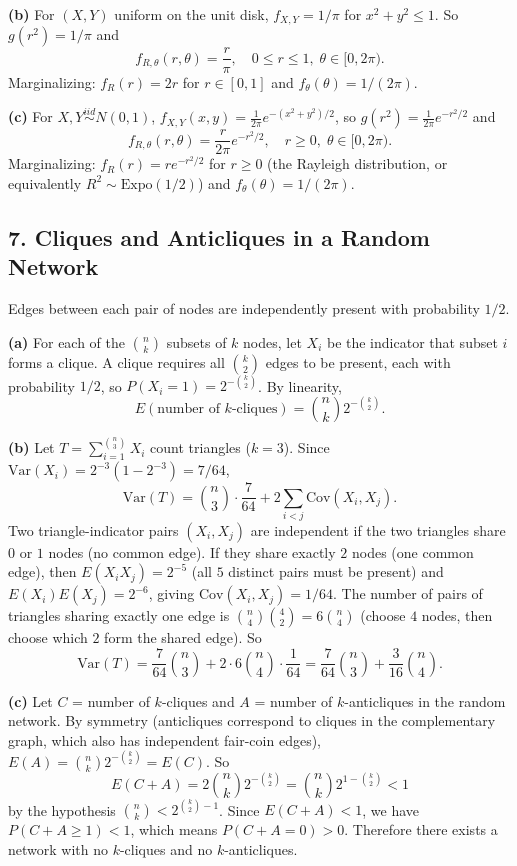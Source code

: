 \documentclass{article}
\begin{document}
\textbf{(b)} For $(X,Y)$ uniform on the unit disk, $f_{X,Y}=1/\pi$ for $x^2+y^2\le1$. So $g(r^2)=1/\pi$ and
$$
f_{R,\theta}(r,\theta) = \frac{r}{\pi}, \quad 0\le r\le1,\;\theta\in[0,2\pi).
$$
Marginalizing: $f_R(r)=2r$ for $r\in[0,1]$ and $f_\theta(\theta)=1/(2\pi)$.

\textbf{(c)} For $X,Y\overset{iid}{\sim}N(0,1)$, $f_{X,Y}(x,y)=\frac{1}{2\pi}e^{-(x^2+y^2)/2}$, so $g(r^2)=\frac{1}{2\pi}e^{-r^2/2}$ and
$$
f_{R,\theta}(r,\theta) = \frac{r}{2\pi}e^{-r^2/2}, \quad r\ge0,\;\theta\in[0,2\pi).
$$
Marginalizing: $f_R(r)=re^{-r^2/2}$ for $r\ge0$ (the Rayleigh distribution, or equivalently $R^2\sim\text{Expo}(1/2)$) and $f_\theta(\theta)=1/(2\pi)$.

\subsection*{7. Cliques and Anticliques in a Random Network}

Edges between each pair of nodes are independently present with probability $1/2$.

\textbf{(a)} For each of the $\binom{n}{k}$ subsets of $k$ nodes, let $X_i$ be the indicator that subset $i$ forms a clique. A clique requires all $\binom{k}{2}$ edges to be present, each with probability $1/2$, so $P(X_i=1)=2^{-\binom{k}{2}}$. By linearity,
$$
E\!\left(\text{number of }k\text{-cliques}\right) = \binom{n}{k}2^{-\binom{k}{2}}.
$$

\textbf{(b)} Let $T=\sum_{i=1}^{\binom{n}{3}}X_i$ count triangles ($k=3$). Since $\text{Var}(X_i)=2^{-3}(1-2^{-3})=7/64$,
$$
\text{Var}(T) = \binom{n}{3}\cdot\frac{7}{64} + 2\sum_{i<j}\text{Cov}(X_i,X_j).
$$
Two triangle-indicator pairs $(X_i,X_j)$ are independent if the two triangles share $0$ or $1$ nodes (no common edge). If they share exactly $2$ nodes (one common edge), then $E(X_iX_j)=2^{-5}$ (all $5$ distinct pairs must be present) and $E(X_i)E(X_j)=2^{-6}$, giving $\text{Cov}(X_i,X_j)=1/64$. The number of pairs of triangles sharing exactly one edge is $\binom{n}{4}\binom{4}{2}=6\binom{n}{4}$ (choose $4$ nodes, then choose which $2$ form the shared edge). So
$$
\text{Var}(T) = \frac{7}{64}\binom{n}{3} + 2\cdot 6\binom{n}{4}\cdot\frac{1}{64} = \frac{7}{64}\binom{n}{3}+\frac{3}{16}\binom{n}{4}.
$$

\textbf{(c)} Let $C$ = number of $k$-cliques and $A$ = number of $k$-anticliques in the random network. By symmetry (anticliques correspond to cliques in the complementary graph, which also has independent fair-coin edges), $E(A)=\binom{n}{k}2^{-\binom{k}{2}}=E(C)$. So
$$
E(C+A) = 2\binom{n}{k}2^{-\binom{k}{2}} = \binom{n}{k}2^{1-\binom{k}{2}} < 1
$$
by the hypothesis $\binom{n}{k}<2^{\binom{k}{2}-1}$. Since $E(C+A)<1$, we have $P(C+A\ge1)<1$, which means $P(C+A=0)>0$. Therefore there exists a network with no $k$-cliques and no $k$-anticliques.
\end{document}
